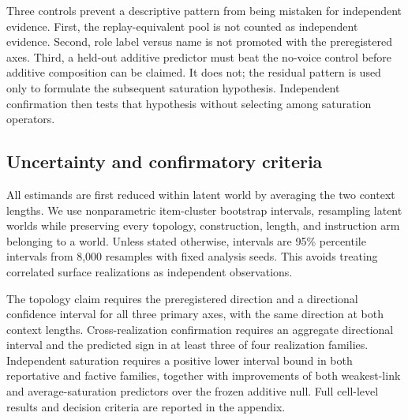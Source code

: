 Three controls prevent a descriptive pattern from being mistaken for
independent evidence.
First, the replay-equivalent pool is not counted as independent evidence.
Second, role label versus name is not promoted with the preregistered axes.
Third, a held-out additive predictor must beat the no-voice control before
additive composition can be claimed. It does not; the residual pattern is used
only to formulate the subsequent saturation hypothesis. Independent
confirmation then tests that hypothesis without selecting among saturation
operators.

\subsection{Uncertainty and confirmatory criteria}

All estimands are first reduced within latent world by averaging the two context
lengths. We use nonparametric item-cluster bootstrap intervals, resampling
latent worlds while preserving every topology, construction, length, and
instruction arm belonging to a world. Unless stated otherwise, intervals are
95\% percentile intervals from 8,000 resamples with fixed analysis seeds. This
avoids treating correlated surface realizations as independent observations.

The topology claim requires the preregistered direction and a directional
confidence interval for all three primary axes, with the same direction at both
context lengths. Cross-realization confirmation requires an aggregate
directional interval and the predicted sign in at least three of four
realization families. Independent saturation requires a positive lower interval
bound in both reportative and factive families, together with improvements of
both weakest-link and average-saturation predictors over the frozen additive
null. Full cell-level results and decision criteria are reported in the
appendix.
